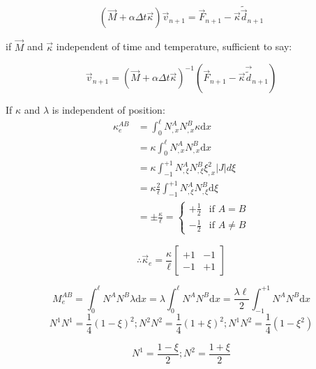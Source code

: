 \begin{equation}
(\vec{M} + \alpha\Delta t \vec{\kappa})\vec{v}_{n+1} = \vec{F}_{n+1} - \vec{\kappa} \tilde{\vec{d}}_{n+1}
\end{equation}


if $\vec{M}$ and $\vec{\kappa}$ independent of time and temperature, sufficient to say:

\begin{equation}
\vec{v}_{n+1} = (\vec{M}+\alpha\Delta t \vec{\kappa})^{-1} (\vec{F}_{n+1} - \vec{\kappa} \vec{\tilde{d}}_{n+1})
\end{equation}

If $\kappa$ and $\lambda$ is independent of position:
\begin{equation}
\begin{aligned}
	\kappa_e^{AB} &= \int_0^\ell N_{,x}^A N_{,x}^B \kappa \text{d}x \\
&= \kappa \int_0^\ell N_{,x}^A N_{,x}^B \text{d}x \\
&= \kappa \int_{-1}^{+1} N_{,\xi}^A N_{,\xi}^B \xi_{,x}^2 \left|J\right|  d\xi \\
&=\kappa \frac{2}{\ell} \int_{-1}^{+1} N_{,\xi}^A N_{,\xi}^B \text{d}\xi\\
&= \pm \frac{\kappa}{\ell} = \begin{cases}
+\frac{1}{2} & \text{if } A = B \\
-\frac{1}{2} & \text{if } A \ne B
\end{cases}
\end{aligned}
\end{equation}

\begin{equation}
\therefore \vec{\kappa}_e = \frac{\kappa}{\ell} \begin{bmatrix} +1 & -1 \\ -1 & +1 \end{bmatrix}
\end{equation}	

\begin{equation}
M_e^{AB} = \int_0^\ell N^A N^B \lambda \text{d}x = \lambda \int_0^\ell N^A N^B \text{d}x = \frac{\lambda \ell}{2} \int_{-1}^{+1} N^A N^B \text{d}x
\end{equation}
\begin{equation}
N^1 N^1 = \frac{1}{4}(1-\xi)^2 ; N^2 N^2 = \frac{1}{4}(1+\xi)^2 ; N^1 N^2 = \frac{1}{4}(1-\xi^2)
\end{equation}

\begin{equation}
N^1 = \frac{1-\xi}{2} ; N^2 = \frac{1+\xi}{2}
\end{equation}

